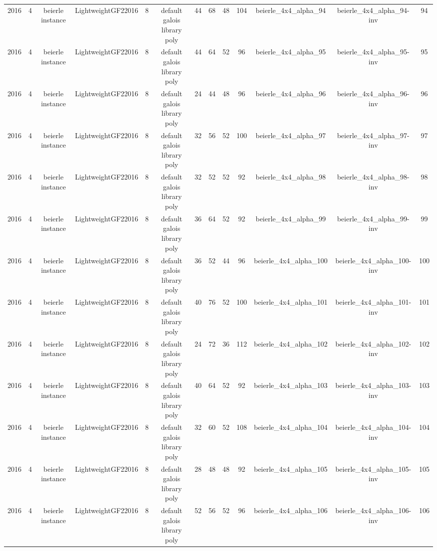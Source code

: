 \begin{tabular}{c c c c c c c c c c c c c}
2016 & 4 & beierle instance & LightweightGF22016 & 8 & default galois library poly & 44 & 68 & 48 & 104 & beierle_4x4_alpha_94 & beierle_4x4_alpha_94-inv & 94 \\
2016 & 4 & beierle instance & LightweightGF22016 & 8 & default galois library poly & 44 & 64 & 52 & 96 & beierle_4x4_alpha_95 & beierle_4x4_alpha_95-inv & 95 \\
2016 & 4 & beierle instance & LightweightGF22016 & 8 & default galois library poly & 24 & 44 & 48 & 96 & beierle_4x4_alpha_96 & beierle_4x4_alpha_96-inv & 96 \\
2016 & 4 & beierle instance & LightweightGF22016 & 8 & default galois library poly & 32 & 56 & 52 & 100 & beierle_4x4_alpha_97 & beierle_4x4_alpha_97-inv & 97 \\
2016 & 4 & beierle instance & LightweightGF22016 & 8 & default galois library poly & 32 & 52 & 52 & 92 & beierle_4x4_alpha_98 & beierle_4x4_alpha_98-inv & 98 \\
2016 & 4 & beierle instance & LightweightGF22016 & 8 & default galois library poly & 36 & 64 & 52 & 92 & beierle_4x4_alpha_99 & beierle_4x4_alpha_99-inv & 99 \\
2016 & 4 & beierle instance & LightweightGF22016 & 8 & default galois library poly & 36 & 52 & 44 & 96 & beierle_4x4_alpha_100 & beierle_4x4_alpha_100-inv & 100 \\
2016 & 4 & beierle instance & LightweightGF22016 & 8 & default galois library poly & 40 & 76 & 52 & 100 & beierle_4x4_alpha_101 & beierle_4x4_alpha_101-inv & 101 \\
2016 & 4 & beierle instance & LightweightGF22016 & 8 & default galois library poly & 24 & 72 & 36 & 112 & beierle_4x4_alpha_102 & beierle_4x4_alpha_102-inv & 102 \\
2016 & 4 & beierle instance & LightweightGF22016 & 8 & default galois library poly & 40 & 64 & 52 & 92 & beierle_4x4_alpha_103 & beierle_4x4_alpha_103-inv & 103 \\
2016 & 4 & beierle instance & LightweightGF22016 & 8 & default galois library poly & 32 & 60 & 52 & 108 & beierle_4x4_alpha_104 & beierle_4x4_alpha_104-inv & 104 \\
2016 & 4 & beierle instance & LightweightGF22016 & 8 & default galois library poly & 28 & 48 & 48 & 92 & beierle_4x4_alpha_105 & beierle_4x4_alpha_105-inv & 105 \\
2016 & 4 & beierle instance & LightweightGF22016 & 8 & default galois library poly & 52 & 56 & 52 & 96 & beierle_4x4_alpha_106 & beierle_4x4_alpha_106-inv & 106 \\

\end{tabular}

